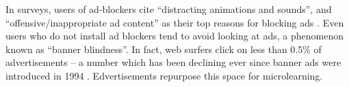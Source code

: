 \documentclass{sigchi}
\begin{document}
In surveys, users of ad-blockers cite ``distracting animations and sounds'', and ``offensive/inappropriate ad content'' as their top reasons for blocking ads \cite{adblockinggames}. Even users who do not install ad blockers tend to avoid looking at ads, a phenomenon known as ``banner blindness''. In fact, web surfers click on less than 0.5\% of advertisements -- a number which has been declining ever since banner ads were introduced in 1994 \cite{whypeopleavoidadvertising}. Edvertisements repurpose this space for microlearning.




\end{document}
